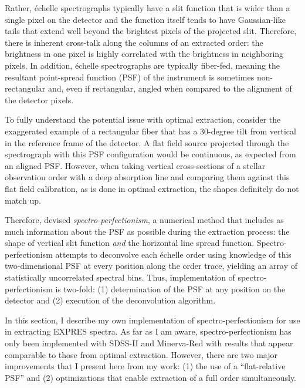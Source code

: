 Rather, \'echelle spectrographs typically have a slit function that is wider than a single pixel on the detector and the function itself tends to have Gaussian-like tails that extend well beyond the brightest pixels of the projected slit. Therefore, there is inherent cross-talk along the columns of an extracted order: the brightness in one pixel is highly correlated with the brightness in neighboring pixels. In addition, \'echelle spectrographs are typically fiber-fed, meaning the resultant point-spread function (PSF) of the instrument is sometimes non-rectangular and, even if rectangular, angled when compared to the alignment of the detector pixels.

To fully understand the potential issue with optimal extraction, consider the exaggerated example of a rectangular fiber that has a 30-degree tilt from vertical in the reference frame of the detector. A flat field source projected through the spectrograph with this PSF configuration would be continuous, as expected from an aligned PSF. However, when taking vertical cross-sections of a stellar observation order with a deep absorption line and comparing them against this flat field calibration, as is done in optimal extraction, the shapes definitely do not match up.

Therefore, \citet{bolton_spectro-perfectionism_2009} devised \textit{spectro-perfectionism}, a numerical me\-thod that includes as much information about the PSF as possible during the extraction process: the shape of vertical slit function \textit{and} the horizontal line spread function. Spectro-perfectionism attempts to deconvolve each \'echelle order using knowledge of this two-dimensional PSF at every position along the order trace, yielding an array of statistically uncorrelated spectral bins. Thus, implementation of spectro-perfectionism is two-fold: (1) determination of the PSF at any position on the detector and (2) execution of the deconvolution algorithm.

In this section, I describe my own implementation of spectro-perfectionism for use in extracting EXPRES spectra. As far as I am aware, spectro-perfectionism has only been implemented with SDSS-II \citep{bolton_spectro-perfectionism_2009} and Minerva-Red \citep{cornachione_full_2019} with results that appear comparable to those from optimal extraction. However, there are two major improvements that I present here from my work: (1) the use of a ``flat-relative PSF'' and (2) optimizations that enable extraction of a full order simultaneously.

